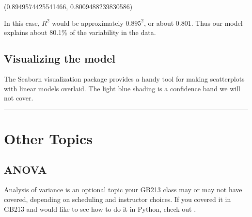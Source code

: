\documentclass[letterpaper,10pt,english]{jupyterBook}
\begin{document}
\begin{sphinxVerbatim}[commandchars=\\\{\}]
(0.8949574425541466, 0.8009488239830586)
\end{sphinxVerbatim}

\sphinxAtStartPar
In this case, \(R^2\) would be approximately \(0.895^2\), or about \(0.801\).  Thus our model explains about 80.1\% of the variability in the data.


\subsection{Visualizing the model}
\label{\detokenize{GB213-review-in-Python:visualizing-the-model}}
\sphinxAtStartPar
The Seaborn visualization package provides a handy tool for making scatterplots with linear models overlaid.  The light blue shading is a confidence band we will not cover.

\begin{sphinxVerbatim}[commandchars=\\\{\}]
    
\end{sphinxVerbatim}

\noindent{}


\bigskip\hrule\bigskip



\section{Other Topics}
\label{\detokenize{GB213-review-in-Python:other-topics}}

\subsection{ANOVA}
\label{\detokenize{GB213-review-in-Python:anova}}
\sphinxAtStartPar
Analysis of variance is an optional topic your GB213 class may or may not have covered, depending on scheduling and instructor choices.  If you covered it in GB213 and would like to see how to do it in Python, check out .
\end{document}
